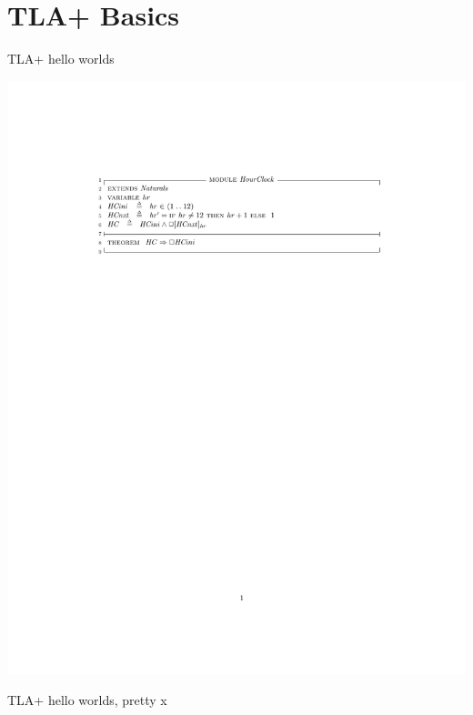 \documentclass[12pt]{beamer}
\begin{document}
  \section{TLA+ Basics}
  \begin{frame}{TLA+ hello worlds}
    \begin{center}
      \includegraphics[scale=0.8]{figures/hourclock.pdf}
    \end{center}
  \end{frame}
  \begin{frame}{TLA+ hello worlds, pretty}
      x
  \end{frame}
\end{document}
